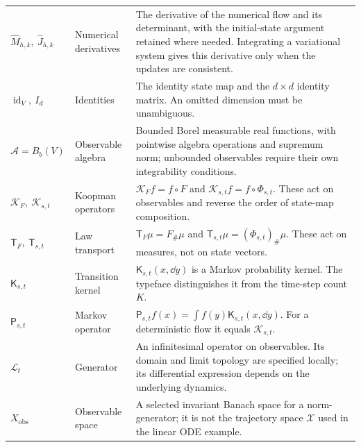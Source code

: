 \begin{longtable}{@{}>{\raggedright\arraybackslash}p{32mm}>{\raggedright\arraybackslash}p{26mm}>{\raggedright\arraybackslash}p{90mm}@{}}
$\widehat M_{h,k},\ \widehat J_{h,k}$ & Numerical derivatives & The derivative of the numerical flow and its determinant, with the initial-state argument retained where needed. Integrating a variational system gives this derivative only when the updates are consistent.\\[3pt]
$\operatorname{id}_V,\ I_d$ & Identities & The identity state map and the $d\times d$ identity matrix. An omitted dimension must be unambiguous.\\[3pt]
$\mathcal A=B_b(V)$ & Observable algebra & Bounded Borel measurable real functions, with pointwise algebra operations and supremum norm; unbounded observables require their own integrability conditions.\\[3pt]
$\mathcal{K}_F,\ \mathcal{K}_{s,t}$ & Koopman operators & $\mathcal{K}_Ff=f\circ F$ and $\mathcal{K}_{s,t}f=f\circ\Phi_{s,t}$. These act on observables and reverse the order of state-map composition.\\[3pt]
$\mathsf T_F,\ \mathsf T_{s,t}$ & Law transport & $\mathsf T_F\mu=F_\#\mu$ and $\mathsf T_{s,t}\mu=(\Phi_{s,t})_\#\mu$. These act on measures, not on state vectors.\\[3pt]
$\mathsf K_{s,t}$ & Transition kernel & $\mathsf K_{s,t}(x,\dd y)$ is a Markov probability kernel. The typeface distinguishes it from the time-step count $K$.\\[3pt]
$\mathsf P_{s,t}$ & Markov operator & $\mathsf P_{s,t}f(x)=\int f(y)\mathsf K_{s,t}(x,\dd y)$. For a deterministic flow it equals $\mathcal{K}_{s,t}$.\\[3pt]
$\mathcal L_t$ & Generator & An infinitesimal operator on observables. Its domain and limit topology are specified locally; its differential expression depends on the underlying dynamics.\\[3pt]
$X_{\mathrm{obs}}$ & Observable space & A selected invariant Banach space for a norm-generator; it is not the trajectory space $\mathcal X$ used in the linear ODE example.\\[3pt]
\end{longtable}
\addtocounter{table}{-1}
\endgroup

